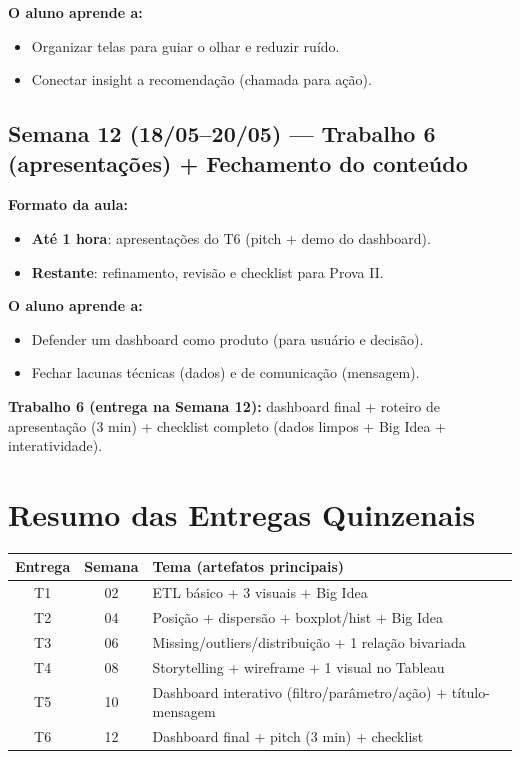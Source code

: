 \textbf{O aluno aprende a:}
\begin{itemize}[leftmargin=*]
  \item Organizar telas para guiar o olhar e reduzir ruído.
  \item Conectar insight a recomendação (chamada para ação).
\end{itemize}

\subsection*{Semana 12 (18/05--20/05) --- Trabalho 6 (apresentações) + Fechamento do conteúdo}
\textbf{Formato da aula:}
\begin{itemize}[leftmargin=*]
  \item \textbf{Até 1 hora}: apresentações do T6 (pitch + demo do dashboard).
  \item \textbf{Restante}: refinamento, revisão e checklist para Prova II.
\end{itemize}

\textbf{O aluno aprende a:}
\begin{itemize}[leftmargin=*]
  \item Defender um dashboard como produto (para usuário e decisão).
  \item Fechar lacunas técnicas (dados) e de comunicação (mensagem).
\end{itemize}

\begin{SolvedBox}
\textbf{Trabalho 6 (entrega na Semana 12):} dashboard final + roteiro de apresentação (3 min) + checklist completo (dados limpos + Big Idea + interatividade).
\end{SolvedBox}

\section{Resumo das Entregas Quinzenais}
\begin{center}
\renewcommand{\arraystretch}{1.15}
\begin{tabular}{@{}c c p{10.5cm}@{}}
\toprule
\textbf{Entrega} & \textbf{Semana} & \textbf{Tema (artefatos principais)} \\
\midrule
T1 & 02 & ETL básico + 3 visuais + Big Idea \\
T2 & 04 & Posição + dispersão + boxplot/hist + Big Idea \\
T3 & 06 & Missing/outliers/distribuição + 1 relação bivariada \\
T4 & 08 & Storytelling + wireframe + 1 visual no Tableau \\
T5 & 10 & Dashboard interativo (filtro/parâmetro/ação) + título-mensagem \\
T6 & 12 & Dashboard final + pitch (3 min) + checklist \\
\bottomrule
\end{tabular}
\end{center}

